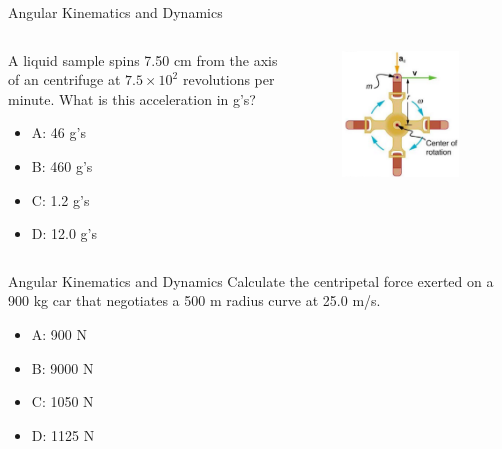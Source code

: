 \documentclass{beamer}
\begin{document}
\begin{frame}{Angular Kinematics and Dynamics}
\begin{columns}[T]
\begin{column}{0.45\textwidth}
\small
A liquid sample spins 7.50 cm from the axis of an centrifuge at $7.5 \times 10^2$ revolutions per minute.  What is this acceleration in g's?
\begin{itemize}
\item A: 46 g's
\item B: 460 g's
\item C: 1.2 g's
\item D: 12.0 g's
\end{itemize}
\end{column}
\begin{column}{0.55\textwidth}
\begin{figure}
\centering
\includegraphics[width=0.9\textwidth]{figures/centrifuge.png}
\end{figure}
\end{column}
\end{columns}
\end{frame}

\begin{frame}{Angular Kinematics and Dynamics}
Calculate the centripetal force exerted on a 900 kg car that negotiates a 500 m radius curve at 25.0 m/s.
\begin{itemize}
\item A: 900 N
\item B: 9000 N
\item C: 1050 N
\item D: 1125 N
\end{itemize}
\end{frame}
\end{document}

